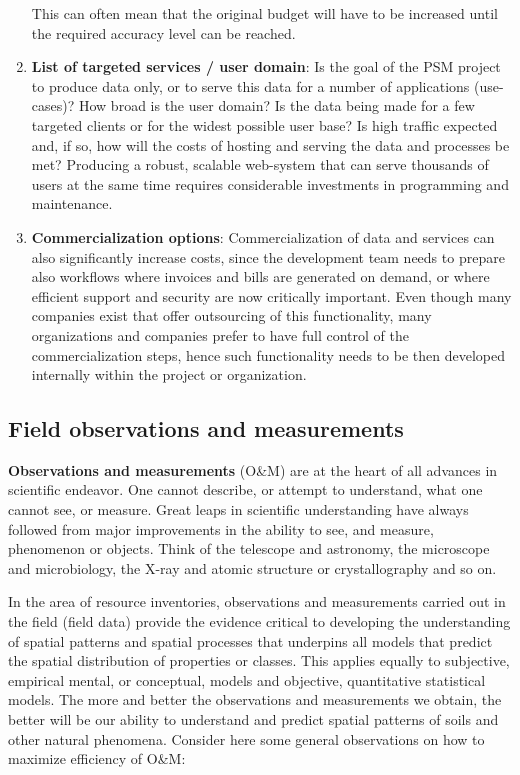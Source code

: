 \documentclass[graybox,natbib,nospthms,UStrade]{svmono}
\begin{document}
\begin{enumerate}
  This can often mean that the original budget will have to be
  increased until the required accuracy level can be reached.
\item
  \textbf{List of targeted services / user domain}: Is the goal of the PSM
  project to produce data only, or to serve this data for a number
  of applications (use-cases)? How broad is the user domain? Is the
  data being made for a few targeted clients or for the widest
  possible user base? Is high traffic expected and, if so, how will
  the costs of hosting and serving the data and processes be met?
  Producing a robust, scalable web-system that can serve thousands
  of users at the same time requires considerable investments in
  programming and maintenance.
\item
  \textbf{Commercialization options}: Commercialization of data and
  services can also significantly increase costs, since the
  development team needs to prepare also workflows where invoices
  and bills are generated on demand, or where efficient support and
  security are now critically important. Even though many companies
  exist that offer outsourcing of this functionality, many
  organizations and companies prefer to have full control of the
  commercialization steps, hence such functionality needs to be then
  developed internally within the project or organization.
\end{enumerate}

\hypertarget{field-observations-and-measurements}{%
\subsection{Field observations and measurements}\label{field-observations-and-measurements}}

\textbf{Observations and measurements} (O\&M) are at the heart of all advances in
scientific endeavor. One cannot describe, or attempt to understand,
what one cannot see, or measure. Great leaps in scientific understanding
have always followed from major improvements in the ability to see, and
measure, phenomenon or objects. Think of the telescope and astronomy,
the microscope and microbiology, the X-ray and atomic structure or
crystallography and so on.

In the area of resource inventories, observations and measurements
carried out in the field (field data) provide the evidence critical to
developing the understanding of spatial patterns and spatial processes
that underpins all models that predict the spatial distribution of
properties or classes. This applies equally to subjective, empirical
mental, or conceptual, models and objective, quantitative statistical
models. The more and better the observations and measurements we obtain,
the better will be our ability to understand and predict spatial
patterns of soils and other natural phenomena. Consider here some
general observations on how to maximize efficiency of O\&M:
\end{document}
